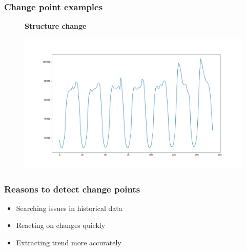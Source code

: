\documentclass[intlimits, 9pt, unicode]{beamer}
\begin{document}
\begin{frame}
\frametitle{Change point examples}
\begin{figure}
\textbf{Structure change}\par\medskip
\includegraphics[scale=0.30]{images/006_structure}
\end{figure}
\end{frame}

\begin{frame}
    \frametitle{Reasons to detect change points}

    \begin{itemize}
    	\item Searching issues in historical data 
	\item Reacting on changes quickly
	\item Extracting trend more accurately
    \end{itemize}
\end{frame}
\end{document}
